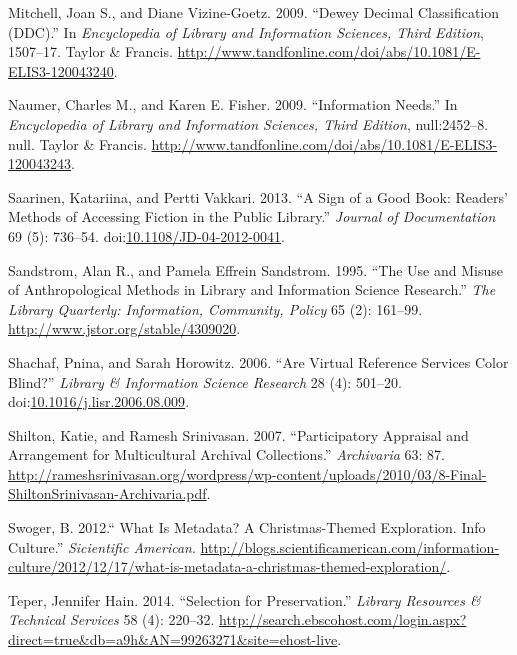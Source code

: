 \documentclass[]{article}
\begin{document}
\hypertarget{ref-mitchellux5fdeweyux5f2009}{}
Mitchell, Joan S., and Diane Vizine-Goetz. 2009. ``Dewey Decimal
Classification (DDC).'' In \emph{Encyclopedia of Library and Information
Sciences, Third Edition}, 1507--17. Taylor \& Francis.
\url{http://www.tandfonline.com/doi/abs/10.1081/E-ELIS3-120043240}.

\hypertarget{ref-naumerux5finformationux5f2009}{}
Naumer, Charles M., and Karen E. Fisher. 2009. ``Information Needs.'' In
\emph{Encyclopedia of Library and Information Sciences, Third Edition},
null:2452--8. null. Taylor \& Francis.
\url{http://www.tandfonline.com/doi/abs/10.1081/E-ELIS3-120043243}.

\hypertarget{ref-saarinenux5fsignux5f2013}{}
Saarinen, Katariina, and Pertti Vakkari. 2013. ``A Sign of a Good Book:
Readers' Methods of Accessing Fiction in the Public Library.''
\emph{Journal of Documentation} 69 (5): 736--54.
doi:\href{https://doi.org/10.1108/JD-04-2012-0041}{10.1108/JD-04-2012-0041}.

\hypertarget{ref-sandstromux5fuseux5f1995}{}
Sandstrom, Alan R., and Pamela Effrein Sandstrom. 1995. ``The Use and
Misuse of Anthropological Methods in Library and Information Science
Research.'' \emph{The Library Quarterly: Information, Community, Policy}
65 (2): 161--99. \url{http://www.jstor.org/stable/4309020}.

\hypertarget{ref-shachafux5fareux5f2006}{}
Shachaf, Pnina, and Sarah Horowitz. 2006. ``Are Virtual Reference
Services Color Blind?'' \emph{Library \& Information Science Research}
28 (4): 501--20.
doi:\href{https://doi.org/10.1016/j.lisr.2006.08.009}{10.1016/j.lisr.2006.08.009}.

\hypertarget{ref-shiltonux5fparticipatoryux5f2007}{}
Shilton, Katie, and Ramesh Srinivasan. 2007. ``Participatory Appraisal
and Arrangement for Multicultural Archival Collections.''
\emph{Archivaria} 63: 87.
\url{http://rameshsrinivasan.org/wordpress/wp-content/uploads/2010/03/8-Final-ShiltonSrinivasan-Archivaria.pdf}.

\hypertarget{ref-swogerux5f.ux5f2012}{}
Swoger, B. 2012.`` What Is Metadata? A Christmas-Themed Exploration.
Info Culture.'' \emph{Sicientific American}.
\href{http://blogs.scientificamerican.com/information-\%20culture/2012/12/17/what-is-metadata-a-christmas-themed-exploration/}{http://blogs.scientificamerican.com/information- culture/2012/12/17/what-is-metadata-a-christmas-themed-exploration/}.

\hypertarget{ref-teperux5fselectionux5f2014}{}
Teper, Jennifer Hain. 2014. ``Selection for Preservation.''
\emph{Library Resources \& Technical Services} 58 (4): 220--32.
\url{http://search.ebscohost.com/login.aspx?direct=true\&db=a9h\&AN=99263271\&site=ehost-live}.
\end{document}
